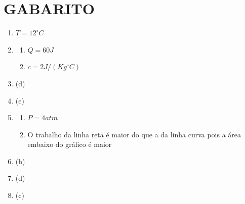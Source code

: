 \documentclass[12pt,letterpaper,fleqn]{article}
\begin{document}
\section*{GABARITO}
\begin{enumerate}
    \item $T=12^\circ C$
    \item
    \begin{enumerate}
        \item$Q=60 J$
        \item $c = 2 J/(Kg ^\circ C)$
    \end{enumerate}
    \item (d)
    \item (e)
    \item \begin{enumerate}
        \item $P=4 atm$ 
        \item O trabalho da linha reta é maior do que a da linha curva pois a área embaixo do gráfico é maior
    \end{enumerate}
    \item (b)
    \item (d)
    \item (c)
\end{enumerate}
\end{document}
